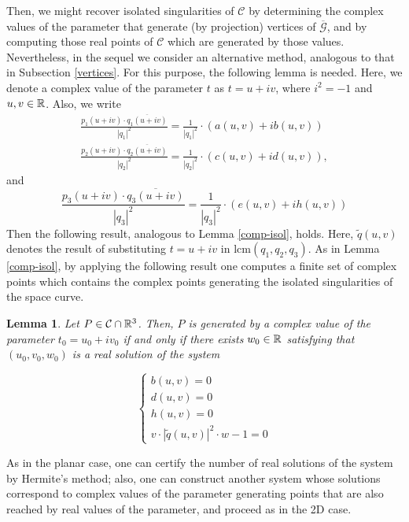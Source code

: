 \documentclass{elsart}
\newtheorem{lemma}[theorem]{{\bf Lemma}}
\begin{document}
Then, we might recover isolated singularities of ${\mathcal C}$ by determining the complex values of the parameter that generate (by projection) vertices of $\overline{\mathcal G}$, and by computing those real points of ${\mathcal C}$ which are generated by those values. Nevertheless, in the sequel we consider an alternative method, analogous to that in Subsection \ref{vertices}. For this purpose, the following lemma is needed. Here, we denote a complex value of the parameter $t$ as $t=u+iv$, where $i^2=-1$ and $u,v\in {\Bbb R}$. Also, we write
\[
\begin{array}{c}
\displaystyle{\frac{p_1(u+iv)\cdot \overline{q_1(u+iv)}}{| q_1|^2}}=\displaystyle{\frac{1}{| q_1|^2}}\cdot \left(a(u,v)+ib(u,v)\right)\\
\displaystyle{\frac{p_2(u+iv)\cdot \overline{q_2(u+iv)}}{| q_2|^2}}=\displaystyle{\frac{1}{| q_2|^2}}\cdot \left(c(u,v)+id(u,v)\right),
\end{array}
\]
and
\[
\displaystyle{\frac{p_3(u+iv)\cdot \overline{q_3(u+iv)}}{| q_3|^2}}=\displaystyle{\frac{1}{| q_3|^2}}\cdot \left(e(u,v)+ih(u,v)\right)
\]
Then the following
result, analogous to Lemma \ref{comp-isol}, holds. Here, $\tilde{q}(u,v)$ denotes the result of substituting $t=u+iv$ in $\mbox{lcm}(q_1,q_2,q_3)$. As in Lemma \ref{comp-isol}, by applying the following result one computes a finite set of complex points which contains the complex points generating the isolated singularities of the space curve.

\begin{lemma} \label{isol-points-3d}
{Let $P\in {\mathcal C}\cap {\Bbb R}^3$. Then, $P$ is generated by
a complex value of the parameter $t_0=u_0+iv_0$ if and only if
there exists $w_0\in {\Bbb R}$ satisfying that $(u_0,v_0,w_0)$ is
a real solution of the system }

\begin{equation}\label{sistema}
\left\{ \begin{array}{c}
b(u,v)=0\\
d(u,v)=0\\
h(u,v)=0\\
v \cdot |\tilde{q}(u,v)|^2 \cdot w-1=0
\end{array} \right.
\end{equation}
\end{lemma}


As in the planar case, one can certify the number of real
solutions of the system by Hermite's method; also, one can
construct another system whose solutions correspond to complex
values of the parameter generating points that are also reached by
real values of the parameter, and proceed as in
the 2D case.
\end{document}
